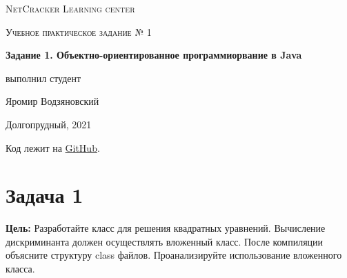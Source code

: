 \documentclass[a4paper]{article}
\begin{document}
\graphicspath{ {pictures/} }

\begin{titlepage}
	\centering
	\vspace{5cm}
    {\scshape\LARGE NetCracker Learning center\par}
	\vspace{5cm}
	{\scshape\Large  Учебное практическое задание № 1 \par}
	\vspace{1cm}
    {\huge\bfseries  Задание 1. Объектно-ориентированное программиорвание в Java \par}
	\vspace{1cm}
	\vfill
    \begin{flushright}
        {\large выполнил студент}\par
        \vspace{0.3cm}
        {\LARGE Яромир Водзяновский}
    \end{flushright}
	\vfill
Долгопрудный, 2021
\end{titlepage}

\pagestyle{fancy} 
\fancyfoot[C]{ \noindent\rule{\textwidth}{0.4pt} \thepage }



\newpage


Код лежит на \href{https://github.com/yarvod/NetCracker_LearningCenter/tree/main/Practise_tasks/Practice_task_1}{GitHub}.

\section{Задача 1}

\textbf{Цель:} Разработайте класс для решения квадратных уравнений. Вычисление дискриминанта должен осуществлять вложенный класс. После компиляции объясните структуру class файлов. Проанализируйте использование вложенного класса. \par
\end{document}
